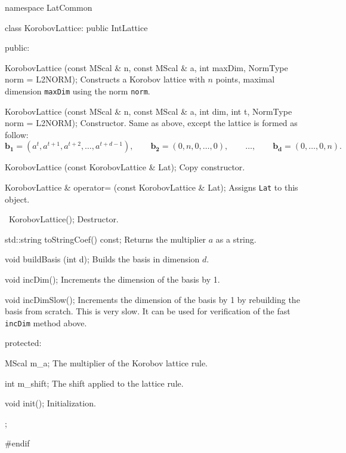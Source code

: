 namespace LatCommon {

class KorobovLattice: public IntLattice {
public:

   KorobovLattice (const MScal & n, const MScal & a, int maxDim,
                   NormType norm = L2NORM);
\endcode
\tabb
  Constructs a Korobov lattice with $n$ points, maximal dimension
\texttt{maxDim} using the norm \texttt{norm}.
\endtabb
\code

   KorobovLattice (const MScal & n, const MScal & a, int dim, int t,
                   NormType norm = L2NORM);
\endcode
\tabb
Constructor. Same as above, except the lattice is formed as follow:
\[
\mathbf{b_1} = (a^t, a^{t+1}, a^{t+2}, \ldots, a^{t+d-1}),\qquad 
\mathbf{b_2} = (0, n, 0, \ldots, 0),\qquad  \ldots,\qquad 
 \mathbf{b_d} = (0, \ldots, 0, n).
\]
\endtabb
\code

   KorobovLattice (const KorobovLattice & Lat);
\endcode
\tabb
Copy constructor.
\endtabb
\code

   KorobovLattice & operator= (const KorobovLattice & Lat);
\endcode
\tabb
Assigns \texttt{Lat} to this object.
\endtabb
\code

   ~KorobovLattice();
\endcode
\tabb
Destructor.
\endtabb
\code

   std::string toStringCoef() const;
\endcode
\tabb
Returns the multiplier $a$ as a string.
\endtabb
\code

   void buildBasis (int d);
\endcode
\tabb
Builds the basis in dimension $d$.
\endtabb
\code

   void incDim();
\endcode
\tabb
   Increments the dimension of the basis by 1.
\endtabb
\code

   void incDimSlow();
\endcode
\tabb
   Increments the dimension of the basis by 1 by rebuilding the basis
from scratch. This is very slow. It can be used for verification of the
fast \texttt{incDim} method above.
\endtabb
\code


protected:

   MScal m_a;
\endcode
\tabb
The multiplier of the Korobov lattice rule.
\endtabb
\code

   int m_shift;
\endcode
\tabb
The shift applied to the lattice rule.
\endtabb
\code

   void init();
\endcode
\tabb
Initialization.
\endtabb
\code

};

}
\hide
#endif
\endhide
\endcode
